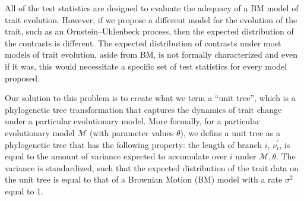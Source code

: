 \documentclass[a4paper,11pt]{article}
\begin{document}
All of the test statistics are designed to evaluate the adequacy of a BM model of trait evolution. However, if we propose a different model for the evolution of the trait, such as an Ornstein--Uhlenbeck \citep[OU;][]{Hansen1997} process, then the expected distribution of the contrasts is different. The expected distribution of contrasts under most models of trait evolution, aside from BM, is not formally characterized and even if it was, this would necessitate a specific set of test statistics for every model proposed.

Our solution to this problem is to create what we term a ``unit tree'', which is a phylogenetic tree transformation that captures the dynamics of trait change under a particular evolutionary model. More formally, for a particular evolutionary model $\mathcal{M}$ (with parameter values $\theta$), we define a unit tree as a phylogenetic tree that has the following property: the length of branch $i$, $\nu_i ^\prime$, is equal to the amount of variance expected to accumulate over $i$ under $\mathcal{M}, \theta$. The variance is standardized, such that the expected distribution of the trait data on the unit tree is equal to that of a Brownian Motion (BM) model with a rate $\sigma^2$ equal to 1.
\end{document}
